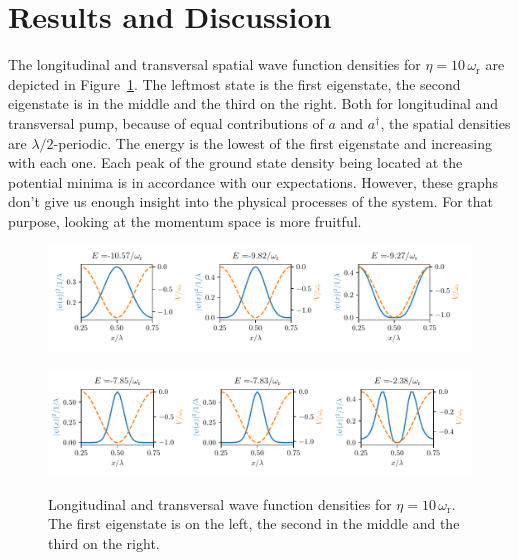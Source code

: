 \section{Results and Discussion}

The longitudinal and transversal spatial wave function densities for $\eta = 10 \, \omega_\text{r}$ are depicted in Figure~\ref{densities}. The leftmost state is the first eigenstate, the second eigenstate is in the middle and the third on the right. Both for longitudinal and transversal pump, because of equal contributions of $a$ and $a^\dagger$, the spatial densities are $\lambda / 2$-periodic. The energy is the lowest of the first eigenstate and increasing with each one. Each peak of the ground state density being located at the potential minima is in accordance with our expectations. However, these graphs don't give us enough insight into the physical processes of the system. For that purpose, looking at the momentum space is more fruitful.

\begin{figure}[!htb]
	\begin{minipage}[b]{1\linewidth}
	\centering
	\includegraphics[width=1\textwidth]{images/dens_long.pdf}
	\label{long_density}
	\end{minipage}
%
	\begin{minipage}[b]{1\linewidth}
	\centering
	\includegraphics[width=1\textwidth]{images/dens_trans.pdf}
	\label{trans_density}
	\end{minipage}
\caption{Longitudinal and transversal wave function densities for $\eta = 10 \, \omega_\text{r}$. The first eigenstate is on the left, the second in the middle and the third on the right.}
\label{densities}
\end{figure}
\FloatBarrier

